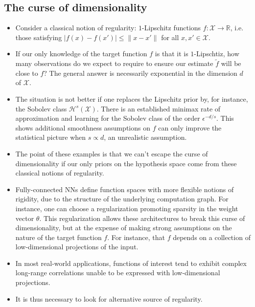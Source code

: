 \documentclass[12pt]{article}
\numberwithin{equation}{section}
\theoremstyle{definition}
\newcommand{		\1		}	{	\bm{1}					}%
\begin{document}
\subsection{The curse of dimensionality} 

\begin{itemize}
\item Consider a classical notion of regularity: $1$-Lipschitz functions $f : \mathcal{X} \to \mathbb{R}$, i.e. those satisfying $|f(x) - f(x') | \leq \| x - x' \|$ for all $x, x' \in \mathcal{X}$. 

\item If our only knowledge of the target function $f$ is that it is $1$-Lipschtiz, how many observations do we expect to require to ensure our estimate $\tilde{f}$ will be close to $f$? The general answer is necessarily exponential in the dimension $d$ of $\mathcal{X}$.

\item The situation is not better if one replaces the Lipschitz prior by, for instance, the Sobolev class $\mathcal{H}^s(\mathcal{X})$. There is an established minimax rate of approximation and learning for the Sobolev class of the order $\epsilon^{-d/s}$. This shows additional smoothness assumptions on $f$ can only improve the statistical picture when $s \propto d$, an unrealistic assumption.

\item The point of these examples is that we can't escape the curse of dimensionality if our only priors on the hypothesis space come from these classical notions of regularity. 

\item Fully-connected NNs define function spaces with more flexible notions of rigidity, due to the structure of the underlying computation graph. For instance, one can choose a regularization promoting sparsity in the weight vector $\theta$. This regularization allows these architectures to break this curse of dimensionality, but at the expense of making strong assumptions on the nature of the target function $f$. For instance, that $f$ depends on a collection of low-dimensional projections of the input.

\item In most real-world applications, functions of interest tend to exhibit complex long-range correlations unable to be expressed with low-dimensional projections. 

\item It is thus necessary to look for alternative source of regularity.

\end{itemize}
\end{document}
